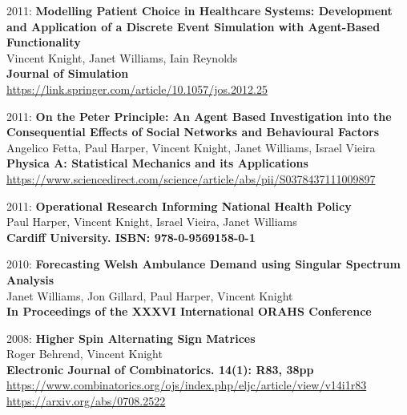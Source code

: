 \documentclass[10pt]{article}
\begin{document}
\begin{etaremune}
  

\item
  2011: \textbf{Modelling Patient Choice in Healthcare Systems: Development and Application of a Discrete Event Simulation with Agent-Based Functionality}\\
  Vincent Knight, Janet Williams, Iain Reynolds\\
  \textbf{Journal of Simulation}\\
  \url{https://link.springer.com/article/10.1057/jos.2012.25}\\
  

\item
  2011: \textbf{On the Peter Principle: An Agent Based Investigation into the Consequential Effects of Social Networks and Behavioural Factors}\\
  Angelico Fetta, Paul Harper, Vincent Knight, Janet Williams, Israel Vieira\\
  \textbf{Physica A: Statistical Mechanics and its Applications}\\
  \url{https://www.sciencedirect.com/science/article/abs/pii/S0378437111009897}\\
  

\item
  2011: \textbf{Operational Research Informing National Health Policy}\\
  Paul Harper, Vincent Knight, Israel Vieira, Janet Williams\\
  \textbf{Cardiff University. ISBN: 978-0-9569158-0-1}\\
  
  

\item
  2010: \textbf{Forecasting Welsh Ambulance Demand using Singular Spectrum Analysis}\\
  Janet Williams, Jon Gillard, Paul Harper, Vincent Knight\\
  \textbf{In Proceedings of the XXXVI International ORAHS Conference}\\
  
  

\item
  2008: \textbf{Higher Spin Alternating Sign Matrices}\\
  Roger Behrend, Vincent Knight\\
  \textbf{Electronic Journal of Combinatorics. 14(1): R83, 38pp}\\
  \url{https://www.combinatorics.org/ojs/index.php/eljc/article/view/v14i1r83}\\
  \url{https://arxiv.org/abs/0708.2522}\\

\end{etaremune}
\end{document}
